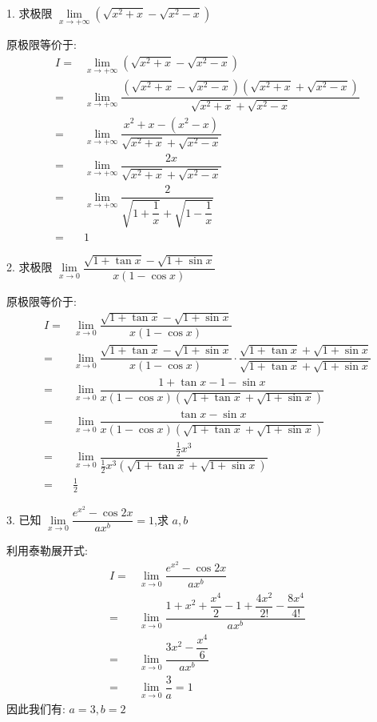1. 求极限 $\lim\limits_{x\to+\infty}(\sqrt{x^{2}+x}-\sqrt{x^{2}-x})$
\begin{solution}

	原极限等价于:
	\begin{align*}
		I = & \lim\limits_{x\to+\infty}(\sqrt{x^{2}+x}-\sqrt{x^{2}-x})\\
		  = & \lim\limits_{x\to+\infty}\dfrac{(\sqrt{x^{2}+x}-\sqrt{x^{2}-x})(\sqrt{x^{2}+x}+\sqrt{x^{2}-x})}{\sqrt{x^{2}+x}+\sqrt{x^{2}-x}}\\
		  = & \lim\limits_{x\to+\infty}\dfrac{x^{2}+x-(x^{2}-x)}{\sqrt{x^{2}+x}+\sqrt{x^{2}-x}}\\
		  = & \lim\limits_{x\to+\infty}\dfrac{2x}{\sqrt{x^{2}+x}+\sqrt{x^{2}-x}}\\
		  = & \lim\limits_{x\to+\infty}\dfrac{2}{\sqrt{1+\dfrac{1}{x}}+\sqrt{1-\dfrac{1}{x}}}\\
		  = & 1
	\end{align*}
\end{solution}

2. 求极限 $\lim\limits_{x\to 0}\dfrac{\sqrt{1+\tan x}-\sqrt{1+\sin x}}{x(1-\cos x)}$
\begin{solution}

	原极限等价于:
	\begin{align*}
		I = & \lim\limits_{x\to 0}\dfrac{\sqrt{1+\tan x}-\sqrt{1+\sin x}}{x(1-\cos x)}\\
		  = & \lim\limits_{x\to 0}\dfrac{\sqrt{1+\tan x}-\sqrt{1+\sin x}}{x(1-\cos x)}\cdot \dfrac{\sqrt{1+\tan x}+\sqrt{1+\sin x}}{\sqrt{1+\tan x}+\sqrt{1+\sin x}}\\
		  = & \lim\limits_{x\to 0}\dfrac{1+\tan x-1-\sin x}{x(1-\cos x)(\sqrt{1+\tan x}+\sqrt{1+\sin x})}\\
		  = & \lim\limits_{x\to 0}\dfrac{\tan x-\sin x}{x(1-\cos x)(\sqrt{1+\tan x}+\sqrt{1+\sin x})}\\
		  = & \lim\limits_{x\to 0}\dfrac{\frac{1}{2}x^{3}}{\frac{1}{2}x^{3}(\sqrt{1+\tan x}+\sqrt{1+\sin x})}\\
		  = & \frac{1}{2}
	\end{align*}
\end{solution}

3. 已知 $\lim\limits_{x\to 0}\dfrac{e^{x^{2}}-\cos 2x}{ax^{b}}=1$,求 $a,b$
\begin{solution}
	利用泰勒展开式:
	\begin{align*}
		I = & \lim\limits_{x\to 0}\dfrac{e^{x^{2}}-\cos 2x}{ax^{b}}\\
		  = & \lim\limits_{x\to 0}\dfrac{1+x^{2}+\dfrac{x^{4}}{2}-1+\dfrac{4x^{2}}{2!}-\dfrac{8x^{4}}{4!}}{ax^{b}}\\
		  = & \lim\limits_{x\to 0}\dfrac{3x^{2}-\dfrac{x^{4}}{6}}{ax^{b}}\\
		  = & \lim\limits_{x\to 0}\dfrac{3}{a} = 1
	\end{align*}
	因此我们有: $a = 3, b = 2$
\end{solution}

